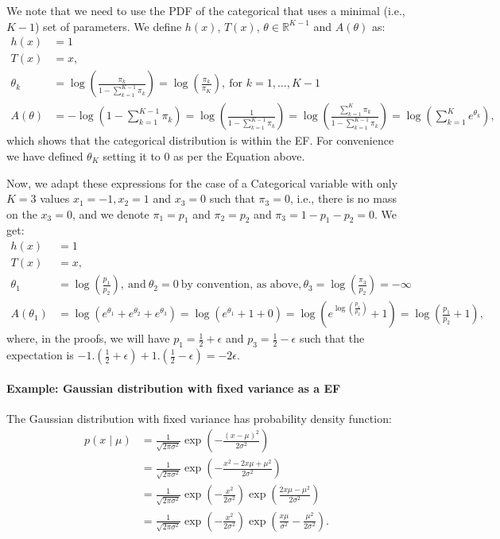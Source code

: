 We note that we need to use the PDF of the categorical that uses a minimal (i.e., $K-1$) set of parameters. We define $h(x)$, $T(x)$, $\theta \in \mathbb{R}^{K-1}$ and $A(\theta)$ as:
\begin{align*}
    h(x)&=1\\
        T(x) & = x,\\
    \theta_k &=\log \left(\frac{\pi_k}{1-\sum_{k=1}^{K-1} \pi_k}\right)=\log \left(\frac{\pi_k}{\pi_K}\right),~\text{for $k = 1, ..., K-1$}\\
    A(\theta) 
    &= -\log \left(1-\sum_{k=1}^{K-1} \pi_k\right)
    =\log \left(\frac{1}{1-\sum_{k=1}^{K-1} \pi_k}\right) 
    =\log \left(\frac{\sum_{k=1}^K \pi_k}{1-\sum_{k=1}^{K-1} \pi_k}\right) 
    = \log \left(\sum_{k=1}^K e^{\theta_k}\right),
\end{align*}
 which shows that the categorical distribution is within the EF. For convenience we have defined $\theta_K$ setting it to $0$ as per the Equation above.

 Now, we adapt these expressions for the case of a Categorical variable with only $K=3$ values $x_1 = -1, x_2 = 1$ and $x_3=0$ such that $\pi_3=0$, i.e., there is no mass on the $x_3=0$, and we denote $\pi_1 = p_1$ and $\pi_2 = p_2$ and $\pi_3 = 1 - p_1 - p_2 = 0$. We get:
 \begin{align*}
    h(x)&=1\\
    T(x) & = x,\\
    \theta_1 &=\log \left(\frac{p_1}{p_2}\right),
    ~\text{and}~
    \theta_2 = 0~\text{by convention, as above},
    \theta_3 =\log \left(\frac{\pi_3}{p_2}\right)= -\infty\\
    A(\theta_1) 
    & 
    = \log \left(e^{\theta_1} + e^{\theta_2} + e^{\theta_3}\right)
    = \log \left(e^{\theta_1} + 1 + 0\right) 
    = \log \left(e^{\log \left(\frac{p_1}{p_2}\right)} + 1\right) 
    = \log \left(\frac{p_1}{p_2} + 1\right) ,
\end{align*}
where, in the proofs, we will have $p_1 = \frac{1}{2} +\epsilon$ and $p_3 = \frac{1}{2} - \epsilon$ such that the expectation is $-1.(\frac{1}{2} +\epsilon)+1.(\frac{1}{2}-\epsilon)=-2\epsilon$.

\paragraph{Example: Gaussian distribution with fixed variance as a EF} The Gaussian distribution with fixed variance has probability density function:
\begin{align*}
    p\left(x \mid \mu \right)
    & =\frac{1}{\sqrt{2 \pi \sigma^2}} \exp \left(
        -\frac{(x-\mu)^2}{2 \sigma^2}
    \right)\\
    &= \frac{1}{\sqrt{2 \pi \sigma^2}} \exp \left(
    -\frac{x^2 -2x\mu +\mu^2}{2 \sigma^2}
    \right)\\
    &= \frac{1}{\sqrt{2 \pi \sigma^2}} \exp \left(-\frac{x^2}{2\sigma^2}\right) \exp \left(
    \frac{2x\mu -\mu^2}{2 \sigma^2}
      \right)\\
    &= \frac{1}{\sqrt{2 \pi \sigma^2}} \exp \left(-\frac{x^2}{2\sigma^2}\right) \exp \left(
    \frac{x\mu}{\sigma^2} - \frac{\mu^2}{2 \sigma^2}
      \right).
\end{align*}

